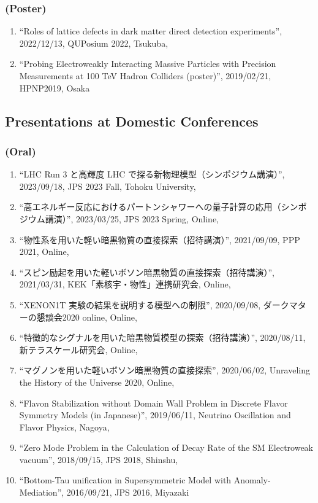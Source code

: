 \documentclass[12pt]{article}
\begin{document}
\subsubsection*{(Poster)}
\begin{enumerate}\item ``Roles of lattice defects in dark matter direct detection experiments'', 2022/12/13, QUPosium 2022, Tsukuba,\item ``Probing Electroweakly Interacting Massive Particles with Precision Measurements at 100 TeV Hadron Colliders (poster)'', 2019/02/21, HPNP2019, Osaka\end{enumerate}

\subsection*{Presentations at Domestic Conferences}
\subsubsection*{(Oral)}
\begin{enumerate}\item ``LHC Run 3 と高輝度 LHC で探る新物理模型（シンポジウム講演）'', 2023/09/18, JPS 2023 Fall, Tohoku University,\item ``高エネルギー反応におけるパートンシャワーへの量子計算の応用（シンポジウム講演）'', 2023/03/25, JPS 2023 Spring, Online,\item ``物性系を用いた軽い暗黒物質の直接探索（招待講演）'', 2021/09/09, PPP 2021, Online,\item ``スピン励起を用いた軽いボソン暗黒物質の直接探索（招待講演）'', 2021/03/31, KEK「素核宇・物性」連携研究会, Online,\item ``XENON1T 実験の結果を説明する模型への制限'', 2020/09/08, ダークマターの懇談会2020 online, Online,\item ``特徴的なシグナルを用いた暗黒物質模型の探索（招待講演）'', 2020/08/11, 新テラスケール研究会, Online,\item ``マグノンを用いた軽いボソン暗黒物質の直接探索'', 2020/06/02, Unraveling the History of the Universe 2020, Online,\item ``Flavon Stabilization without Domain Wall Problem in Discrete Flavor Symmetry Models (in Japanese)'', 2019/06/11, Neutrino Oscillation and Flavor Physics, Nagoya,\item ``Zero Mode Problem in the Calculation of Decay Rate of the SM Electroweak vacuum'', 2018/09/15, JPS 2018, Shinshu,\item ``Bottom-Tau unification in Supersymmetric Model with Anomaly-Mediation'', 2016/09/21, JPS 2016, Miyazaki\end{enumerate}
\end{document}
